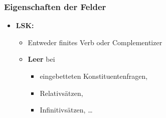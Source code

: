 \begin{frame}
\frametitle{Eigenschaften der Felder}

\begin{itemize}
	\item \textbf{LSK:}

\begin{table}
\centering
{}
\end{table}

\pause 

\begin{itemize}
	\item Entweder finites Verb oder Complementizer
	\item \textbf{Leer} bei 
	
	\begin{itemize}
		\item eingebetteten Konstituentenfragen, 
		\item Relativsätzen, 
		\item Infinitivsätzen, \dots
	\end{itemize}
\end{itemize}

\end{itemize}

	
\end{frame}


